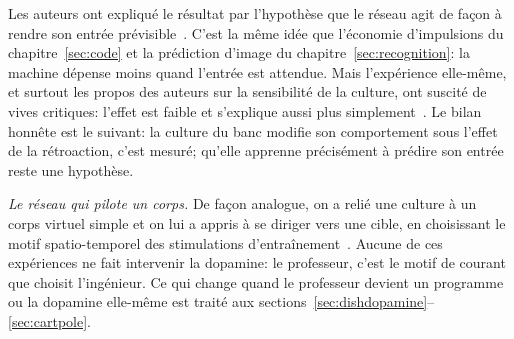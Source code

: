 Les auteurs ont expliqué le résultat par l'hypothèse que le réseau agit de façon à rendre son entrée prévisible~\cite{Friston2010}. C'est la même idée que l'économie d'impulsions du chapitre~\ref{sec:code} et la prédiction d'image du chapitre~\ref{sec:recognition}: la machine dépense moins quand l'entrée est attendue. Mais l'expérience elle-même, et surtout les propos des auteurs sur la \og sensibilité\fg{} de la culture, ont suscité de vives critiques: l'effet est faible et s'explique aussi plus simplement~\cite{Balci2023}. Le bilan honnête est le suivant: la culture du banc modifie son comportement sous l'effet de la rétroaction, c'est mesuré; qu'elle apprenne précisément à prédire son entrée reste une hypothèse.

\emph{Le réseau qui pilote un corps.} De façon analogue, on a relié une culture à un \og corps\fg{} virtuel simple et on lui a appris à se diriger vers une cible, en choisissant le motif spatio-temporel des stimulations d'entraînement~\cite{Bakkum2008}. Aucune de ces expériences ne fait intervenir la dopamine: le professeur, c'est le motif de courant que choisit l'ingénieur. Ce qui change quand le professeur devient un programme ou la dopamine elle-même est traité aux sections~\ref{sec:dishdopamine}--\ref{sec:cartpole}.

